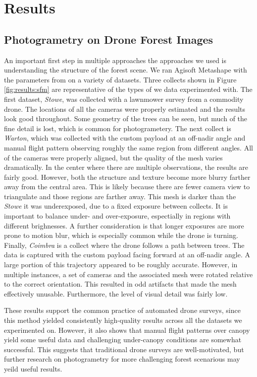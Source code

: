 \chapter{Results} \label{chapResults}
\section{Photogrametry on Drone Forest Images}
An important first step in multiple approaches the approaches we used is understanding the structure of the forest scene. We ran Agisoft Metashape with the parameters from \cite{Young2022} on a variety of datasets. Three collects shown in Figure \ref{fig:results:sfm} are representative of the types of we data experimented with. The first dataset, \textit{Stowe}, was collected with a lawnmower survey from a commodity drone. The locations of all the cameras were properly estimated and the results look good throughout. Some geometry of the trees can be seen, but much of the fine detail is lost, which is common for photogrametery. The next collect is \textit{Warton}, which was collected with the custom payload at an off-nadir angle and manual flight pattern observing roughly the same region from different angles. All of the cameras were properly aligned, but the quality of the mesh varies dramatically. In the center where there are multiple observations, the results are fairly good. However, both the structure and texture become more blurry farther away from the central area. This is likely because there are fewer camera view to triangulate and those regions are farther away. This mesh is darker than the \textit{Stowe} it was underexposed, due to a fixed exposure between collects. It is important to balance under- and over-exposure, espectially in regions with different brighnesses. A further consideration is that longer exposures are more prone to motion blur, which is especially common while the drone is turning.
Finally, \textit{Coimbra} is a collect where the drone follows a path between trees. The data is captured with the custom payload facing forward at an off-nadir angle. A large portion of this trajectory appeared to be roughly accurate. However, in multiple instances, a set of cameras and the associated mesh were rotated relative to the correct orientation. This resulted in odd artifacts that made the mesh effectively unusable. Furthermore, the level of visual detail was fairly low.

These results support the common practice of automated drone surveys, since this method yielded consistently high-quality results across all the datasets we experimented on. However, it also shows that manual flight patterns over canopy yield some useful data and challenging under-canopy conditions are somewhat successful. This suggests that traditional drone surveys are well-motivated, but further research on photogrametry for more challenging forest scenarious may yeild useful results.


